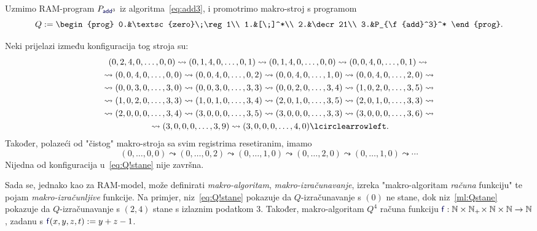\begin{primjer}[{name=[makro-program $Q$]}]\label{pr:makro}
Uzmimo RAM-program $P_{\f{add}^3}$ iz algoritma~\eqref{eq:add3}, i promotrimo makro-stroj s programom
\begin{equation}
    Q:=\begin{prog}
        0.&\textsc{zero}\;\reg1\\
        1.&[\;]^*\\
        2.&\decr21\\
        3.&P_{\f{add}^3}^*
    \end{prog}\text.
\end{equation}
\smallskip 

\noindent Neki prijelazi između konfiguracija tog stroja su:
\begin{multline}\label{ml:Qstane}
    (0,2,4,0,\dotsc,0,0)\leadsto
    (0,1,4,0,\dotsc,0,1)\leadsto
    (0,1,4,0,\dotsc,0,0)\leadsto
    (0,0,4,0,\dotsc,0,1)\leadsto{}\\{}\leadsto
    (0,0,4,0,\dotsc,0,0)\leadsto
    (0,0,4,0,\dotsc,0,2)\leadsto
    (0,0,4,0,\dotsc,1,0)\leadsto
    (0,0,4,0,\dotsc,2,0)\leadsto{}\\{}\leadsto
    (0,0,3,0,\dotsc,3,0)\leadsto
    (0,0,3,0,\dotsc,3,3)\leadsto
    (0,0,2,0,\dotsc,3,4)\leadsto
    (1,0,2,0,\dotsc,3,5)\leadsto{}\\{}\leadsto
    (1,0,2,0,\dotsc,3,3)\leadsto
    (1,0,1,0,\dotsc,3,4)\leadsto
    (2,0,1,0,\dotsc,3,5)\leadsto
    (2,0,1,0,\dotsc,3,3)\leadsto{}\\{}\leadsto
    (2,0,0,0,\dotsc,3,4)\leadsto
    (3,0,0,0,\dotsc,3,5)\leadsto
    (3,0,0,0,\dotsc,3,3)\leadsto
    (3,0,0,0,\dotsc,3,6)\leadsto{}\\{}\leadsto
    (3,0,0,0,\dotsc,3,9)\leadsto
    (3,0,0,0,\dotsc,4,0)\lcirclearrowleft\text.
\end{multline}
Također, polazeći od "čistog" makro-stroja sa svim registrima resetiranim, imamo
\begin{equation}\label{eq:Q!stane}
    (0,\dotsc,0,0)\leadsto
    (0,\dotsc,0,2)\leadsto
    (0,\dotsc,1,0)\leadsto
    (0,\dotsc,2,0)\leadsto
    (0,\dotsc,1,0)\leadsto\dotsb
\end{equation}
    Nijedna od konfiguracija u~\eqref{eq:Q!stane} nije završna.
\end{primjer}

Sada se, jednako kao za RAM-model, može definirati \emph{makro-algoritam}, \emph{makro-izračunavanje}, izreka "makro-algoritam \emph{računa} funkciju" te pojam \emph{makro-izračunljive} funkcije. Na primjer, niz~\eqref{eq:Q!stane} pokazuje da $Q$-izračunavanje s $(0)$ ne stane, dok niz~\eqref{ml:Qstane} pokazuje da $Q$-izračunavanje s $(2,4)$ stane s izlaznim podatkom $3$. Također, makro-algoritam $Q^4$ računa funkciju $\f{f}:\N\times\N_+\!\times\N\times\N\to\N$, zadanu s $\f{f}(x,y,z,t):=y+z-1$.

